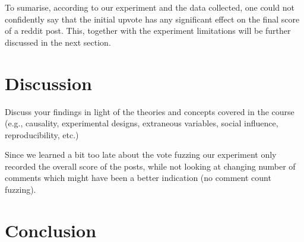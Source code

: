 \documentclass[fleqn,12pt]{article}
\begin{document}
To sumarise, according to our experiment and the data collected, one
could not confidently say that the initial upvote has any significant effect on the final 
score of a reddit post. This, together
with the experiment limitations will be further discussed 
in the next section.

\section{Discussion}

Discuss your findings in light of the theories and concepts covered in the course (e.g., causality, experimental designs,
extraneous variables, social influence, reproducibility, etc.)

Since we learned a bit too late about the vote fuzzing our experiment only recorded the overall score of the posts, while not looking at changing number of comments
which might have been a better indication (no comment count fuzzing).
\section{Conclusion}


 \newpage 


\end{document}
